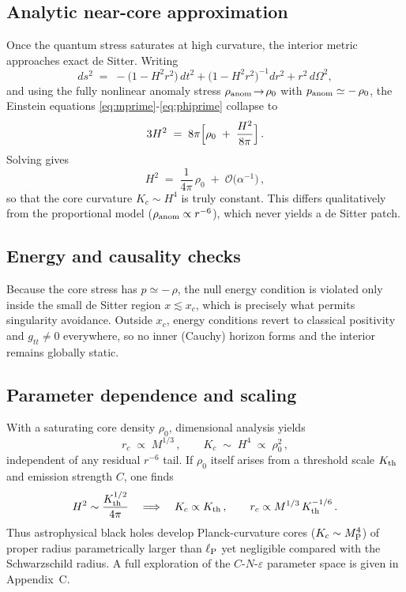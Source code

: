 \subsection{Analytic near-core approximation}
\label{sec:analytic}

Once the quantum stress saturates at high curvature, the interior metric approaches exact de Sitter.  Writing
\[
  ds^2 \;=\; -\bigl(1 - H^2 r^2\bigr)\,dt^2
    + \bigl(1 - H^2 r^2\bigr)^{-1}dr^2
    + r^2\,d\Omega^2,
\]
and using the fully nonlinear anomaly stress
\(\rho_{\rm anom}\!\to\!\rho_0\) with \(p_{\rm anom}\simeq -\,\rho_0\), the Einstein equations 
\eqref{eq:mprime}-\eqref{eq:phiprime} collapse to
\[
  3H^2 \;=\; 8\pi\Bigl[\rho_0 \;+\;\frac{H^2}{8\pi}\Bigr]\,.
\]
Solving gives
\[
  H^2 \;=\;\frac{1}{4\pi}\,\rho_0
    \;+\;\mathcal{O}\bigl(\alpha^{-1}\bigr)\,,
\]
so that the core curvature \(K_c\sim H^4\) is truly constant.  This differs qualitatively from the proportional model (\(\rho_{\rm anom}\propto r^{-6}\)), which never yields a de Sitter patch.

\subsection{Energy and causality checks}
\label{sec:checks}

Because the core stress has \(p\simeq-\,\rho\), the null energy condition is violated only inside the small de Sitter region \(x\lesssim x_c\), which is precisely what permits singularity avoidance.  Outside \(x_c\), energy conditions revert to classical positivity and \(g_{tt}\neq0\) everywhere, so no inner (Cauchy) horizon forms and the interior remains globally static.

\subsection{Parameter dependence and scaling}
\label{sec:param_scan}

With a saturating core density \(\rho_0\), dimensional analysis yields
\[
  r_c\;\propto\;M^{1/3}\,, 
  \qquad 
  K_c \;\sim\; H^4 \;\propto\;\rho_0^2\,,
\]
independent of any residual \(r^{-6}\) tail.  If \(\rho_0\) itself arises from a threshold scale \(K_{\rm th}\) and emission strength \(C\), one finds
\[
  H^2\sim\frac{K_{\rm th}^{1/2}}{4\pi}\quad\Longrightarrow\quad
  K_c\propto K_{\rm th}\,,\qquad
  r_c\propto M^{1/3}\,K_{\rm th}^{-1/6}\,.
\]
Thus astrophysical black holes develop Planck-curvature cores (\(K_c\sim M_{\rm P}^4\)) of proper radius parametrically larger than \(\ell_{\rm P}\) yet negligible compared with the Schwarzschild radius.  A full exploration of the \(C\)-\(N\)-\(\varepsilon\) parameter space is given in Appendix~C.
